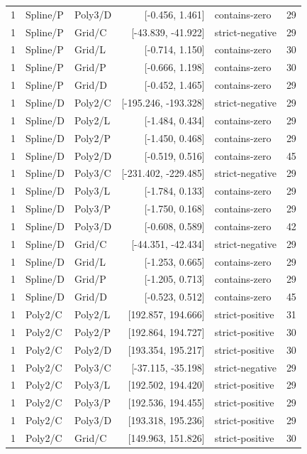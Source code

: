 \begin{longtable}{lllrlr}
1 & Spline/P & Poly3/D & [-0.456, 1.461] & contains-zero & 29 \\
1 & Spline/P & Grid/C & [-43.839, -41.922] & strict-negative & 29 \\
1 & Spline/P & Grid/L & [-0.714, 1.150] & contains-zero & 30 \\
1 & Spline/P & Grid/P & [-0.666, 1.198] & contains-zero & 30 \\
1 & Spline/P & Grid/D & [-0.452, 1.465] & contains-zero & 29 \\
1 & Spline/D & Poly2/C & [-195.246, -193.328] & strict-negative & 29 \\
1 & Spline/D & Poly2/L & [-1.484, 0.434] & contains-zero & 29 \\
1 & Spline/D & Poly2/P & [-1.450, 0.468] & contains-zero & 29 \\
1 & Spline/D & Poly2/D & [-0.519, 0.516] & contains-zero & 45 \\
1 & Spline/D & Poly3/C & [-231.402, -229.485] & strict-negative & 29 \\
1 & Spline/D & Poly3/L & [-1.784, 0.133] & contains-zero & 29 \\
1 & Spline/D & Poly3/P & [-1.750, 0.168] & contains-zero & 29 \\
1 & Spline/D & Poly3/D & [-0.608, 0.589] & contains-zero & 42 \\
1 & Spline/D & Grid/C & [-44.351, -42.434] & strict-negative & 29 \\
1 & Spline/D & Grid/L & [-1.253, 0.665] & contains-zero & 29 \\
1 & Spline/D & Grid/P & [-1.205, 0.713] & contains-zero & 29 \\
1 & Spline/D & Grid/D & [-0.523, 0.512] & contains-zero & 45 \\
1 & Poly2/C & Poly2/L & [192.857, 194.666] & strict-positive & 31 \\
1 & Poly2/C & Poly2/P & [192.864, 194.727] & strict-positive & 30 \\
1 & Poly2/C & Poly2/D & [193.354, 195.217] & strict-positive & 30 \\
1 & Poly2/C & Poly3/C & [-37.115, -35.198] & strict-negative & 29 \\
1 & Poly2/C & Poly3/L & [192.502, 194.420] & strict-positive & 29 \\
1 & Poly2/C & Poly3/P & [192.536, 194.455] & strict-positive & 29 \\
1 & Poly2/C & Poly3/D & [193.318, 195.236] & strict-positive & 29 \\
1 & Poly2/C & Grid/C & [149.963, 151.826] & strict-positive & 30 \\

\end{longtable}
